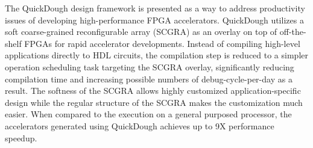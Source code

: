 The QuickDough design framework is presented as a way to address productivity issues of developing
high-performance FPGA accelerators. QuickDough utilizes a soft coarse-grained reconfigurable array
(SCGRA) as an overlay on top of off-the-shelf FPGAs for rapid accelerator developments.
Instead of compiling high-level applications directly to HDL circuits, the compilation step is
reduced to a simpler operation scheduling task targeting the SCGRA overlay, significantly reducing
compilation time and increasing possible numbers of debug-cycle-per-day as a result.
The softness of the SCGRA allows highly customized application-specific design while the regular
structure of the SCGRA makes the customization much easier. When compared to the
execution on a general purposed processor, the accelerators generated using QuickDough achieves up
to 9X performance speedup.
